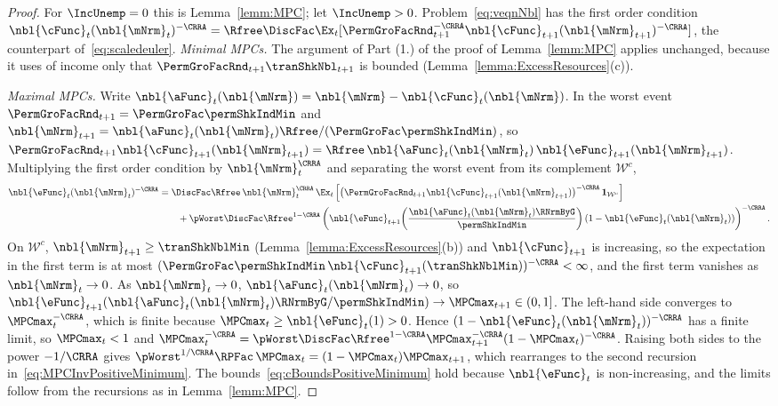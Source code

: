 \documentclass[\econtexRoot/BufferStockTheory]{subfiles}
\begin{document}
\begin{proof}
For $\IncUnemp=0$ this is Lemma~\ref{lemm:MPC}; let $\IncUnemp>0$.
Problem~\eqref{eq:veqnNbl} has the first order condition $\nbl{\cFunc}_{t}(\nbl{\mNrm}_{t})^{-\CRRA}=\Rfree\DiscFac\Ex_{t}[\PermGroFacRnd_{t+1}^{-\CRRA}\nbl{\cFunc}_{t+1}(\nbl{\mNrm}_{t+1})^{-\CRRA}]$, the counterpart of~\eqref{eq:scaledeuler}.
\emph{Minimal MPCs.}
The argument of Part (1.) of the proof of Lemma~\ref{lemm:MPC} applies unchanged, because it uses of income only that $\PermGroFacRnd_{t+1}\tranShkNbl_{t+1}$ is bounded (Lemma~\ref{lemma:ExcessResources}(c)).

\emph{Maximal MPCs.}
Write $\nbl{\aFunc}_{t}(\nbl{\mNrm})=\nbl{\mNrm}-\nbl{\cFunc}_{t}(\nbl{\mNrm})$.
In the worst event $\PermGroFacRnd_{t+1}=\PermGroFac\permShkIndMin$ and $\nbl{\mNrm}_{t+1}=\nbl{\aFunc}_{t}(\nbl{\mNrm}_{t})\Rfree/(\PermGroFac\permShkIndMin)$, so $\PermGroFacRnd_{t+1}\nbl{\cFunc}_{t+1}(\nbl{\mNrm}_{t+1})=\Rfree\,\nbl{\aFunc}_{t}(\nbl{\mNrm}_{t})\,\nbl{\eFunc}_{t+1}(\nbl{\mNrm}_{t+1})$.
Multiplying the first order condition by $\nbl{\mNrm}_{t}^{\CRRA}$ and separating the worst event from its complement $\mathcal{W}^{c}$,
\begin{equation}\label{eq:eFuncEulerPositiveMinimum}
  \begin{aligned}
  \nbl{\eFunc}_{t}(\nbl{\mNrm}_{t})^{-\CRRA}
  & =\DiscFac\Rfree\,\nbl{\mNrm}_{t}^{\CRRA}\,\Ex_{t}\left[\left(\PermGroFacRnd_{t+1}\nbl{\cFunc}_{t+1}(\nbl{\mNrm}_{t+1})\right)^{-\CRRA}\mathbf{1}_{\mathcal{W}^{c}}\right] \\
  & \qquad +\pWorst\DiscFac\Rfree^{1-\CRRA}\left(\nbl{\eFunc}_{t+1}\!\left(\frac{\nbl{\aFunc}_{t}(\nbl{\mNrm}_{t})\RNrmByG}{\permShkIndMin}\right)\left(1-\nbl{\eFunc}_{t}(\nbl{\mNrm}_{t})\right)\right)^{-\CRRA}.
  \end{aligned}
\end{equation}
On $\mathcal{W}^{c}$, $\nbl{\mNrm}_{t+1}\geq\tranShkNblMin$ (Lemma~\ref{lemma:ExcessResources}(b)) and $\nbl{\cFunc}_{t+1}$ is increasing, so the expectation in the first term is at most $(\PermGroFac\permShkIndMin\,\nbl{\cFunc}_{t+1}(\tranShkNblMin))^{-\CRRA}<\infty$, and the first term vanishes as $\nbl{\mNrm}_{t}\rightarrow 0$.
As $\nbl{\mNrm}_{t}\rightarrow 0$, $\nbl{\aFunc}_{t}(\nbl{\mNrm}_{t})\rightarrow 0$, so $\nbl{\eFunc}_{t+1}(\nbl{\aFunc}_{t}(\nbl{\mNrm}_{t})\RNrmByG/\permShkIndMin)\rightarrow\MPCmax_{t+1}\in(0,1]$.
The left-hand side converges to $\MPCmax_{t}^{-\CRRA}$, which is finite because $\MPCmax_{t}\geq\nbl{\eFunc}_{t}(1)>0$.
Hence $(1-\nbl{\eFunc}_{t}(\nbl{\mNrm}_{t}))^{-\CRRA}$ has a finite limit, so $\MPCmax_{t}<1$ and
$\MPCmax_{t}^{-\CRRA}=\pWorst\DiscFac\Rfree^{1-\CRRA}\MPCmax_{t+1}^{-\CRRA}(1-\MPCmax_{t})^{-\CRRA}$.
Raising both sides to the power $-1/\CRRA$ gives $\pWorst^{1/\CRRA}\RPFac\,\MPCmax_{t}=(1-\MPCmax_{t})\MPCmax_{t+1}$, which rearranges to the second recursion in~\eqref{eq:MPCInvPositiveMinimum}.
The bounds~\eqref{eq:cBoundsPositiveMinimum} hold because $\nbl{\eFunc}_{t}$ is non-increasing, and the limits follow from the recursions as in Lemma~\ref{lemm:MPC}.
\end{proof}
\end{document}
